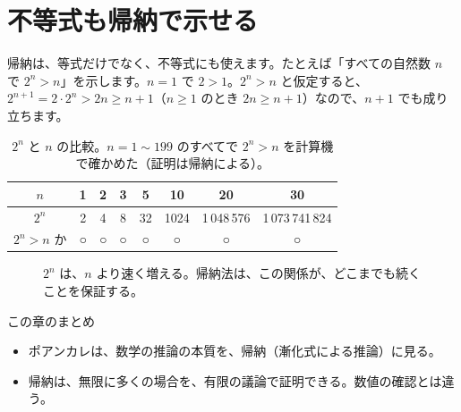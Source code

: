 \documentclass[a4paper,11pt,openany]{ltjsbook}
\begin{document}
\section{不等式も帰納で示せる}

帰納は、等式だけでなく、不等式にも使えます。たとえば「すべての自然数 $n$ で $2^n>n$」を示します。$n=1$ で $2>1$。$2^n>n$ と仮定すると、$2^{n+1}=2\cdot2^n>2n\ge n+1$（$n\ge1$ のとき $2n\ge n+1$）なので、$n+1$ でも成り立ちます。

\begin{table}[htbp]
\centering
\begin{tabular}{c|ccccccc}
\toprule
$n$ & 1 & 2 & 3 & 5 & 10 & 20 & 30\\
\midrule
$2^n$ & 2 & 4 & 8 & 32 & 1024 & 1\,048\,576 & 1\,073\,741\,824\\
$2^n>n$ か & ○ & ○ & ○ & ○ & ○ & ○ & ○\\
\bottomrule
\end{tabular}
\caption{$2^n$ と $n$ の比較。$n=1\sim199$ のすべてで $2^n>n$ を計算機で確かめた（証明は帰納による）。}
\end{table}

\begin{figure}[htbp]
\centering
{}
\caption{$2^n$ は、$n$ より速く増える。帰納法は、この関係が、どこまでも続くことを保証する。}
\end{figure}

\begin{pointbox}{この章のまとめ}
\begin{itemize}[leftmargin=*]
\item ポアンカレは、数学の推論の本質を、帰納（漸化式による推論）に見る。
\item 帰納は、無限に多くの場合を、有限の議論で証明できる。数値の確認とは違う。
\end{itemize}
\end{pointbox}
\end{document}
